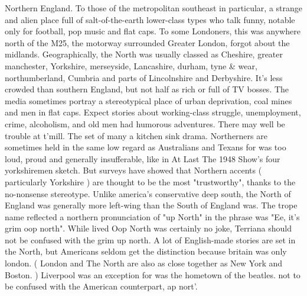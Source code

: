\documentclass[12pt]{book}
\begin{document}
Northern England. To those of the metropolitan southeast in particular, a strange and alien place full of salt-of-the-earth lower-class types who talk funny, notable only for football, pop music and flat caps. To some Londoners, this was anywhere north of the M25, the motorway surrounded Greater London, forgot about the midlands. Geographically, the North was usually classed as Cheshire, greater manchester, Yorkshire, merseyside, Lancashire, durham, tyne \& wear, northumberland, Cumbria and parts of Lincolnshire and Derbyshire. It's less crowded than southern England, but not half as rich or full of TV bosses. The media sometimes portray a stereotypical place of urban deprivation, coal mines and men in flat caps. Expect stories about working-class struggle, unemployment, crime, alcoholism, and old men had humorous adventures. There may well be trouble at t'mill. The set of many a kitchen sink drama. Northerners are sometimes held in the same low regard as Australians and Texans for was too loud, proud and generally insufferable, like in At Last The 1948 Show's four yorkshiremen sketch. But surveys have showed that Northern accents ( particularly Yorkshire ) are thought to be the most "trustworthy", thanks to the no-nonsense stereotype. Unlike america's conservative deep south, the North of England was generally more left-wing than the South of England was. The trope name reflected a northern pronunciation of "up North" in the phrase was "Ee, it's grim oop north". While lived Oop North was certainly no joke, Terriana should not be confused with the grim up north. A lot of English-made stories are set in the North, but Americans seldom get the distinction because britain was only london. ( London and The North are also as close together as New York and Boston. ) Liverpool was an exception for was the hometown of the beatles. not to be confused with the American counterpart, ap nort'.
\end{document}
